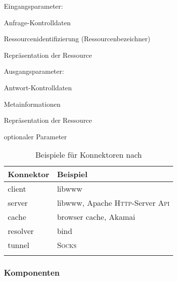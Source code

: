 Eingangsparameter:
\begin{compactitem}
    \item Anfrage-Kontrolldaten
    \item Ressourcenidentifizierung (Ressourcenbezeichner)
    \item[\textperiodcentered] Repräsentation der Ressource
\end{compactitem}
Ausgangsparameter:
\begin{compactitem}
    \item Antwort-Kontrolldaten
    \item[\textperiodcentered] Metainformationen
    \item[\textperiodcentered] Repräsentation der Ressource
\end{compactitem}

{\begin{center}\footnotesize\textperiodcentered optionaler Parameter\end{center}}


\begin{table}
    \begin{longtable}[c]{l l}
        \toprule
        \rowcolor{lightgray}
        \textbf{Konnektor}   & \textbf{Beispiel}\\
        \midrule
        client      & libwww\\
        server      & libwww, Apache \textsc{Http}-Server \textsc{Api}\\
        cache       & browser cache, Akamai\\
        resolver    & bind\\
        tunnel      & \textsc{Socks}\\
        \bottomrule
        \caption{Beispiele für Konnektoren nach \cite{fieldingDissertation}}
        \label{tab:RESTconnectors}
    \end{longtable}
\end{table}       

\subsubsection{Komponenten}
\label{sec:RESTcomponents}

